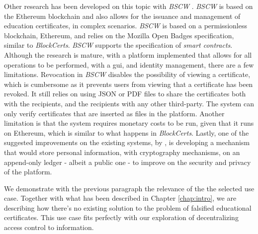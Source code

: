 Other research has been developed on this topic with \emph{BSCW} \cite{grather_blockchain_2018}. \emph{BSCW} is based on the Ethereum blockchain and also allows for the issuance and management of education certificates, in complex scenarios. \emph{BSCW} is based on a permissionless blockchain, Ethereum, and relies on the Mozilla Open Badges specification, similar to \emph{BlockCerts}. \emph{BSCW} supports the specification of \emph{smart contracts}. Although the research is mature, with a platform implemented that allows for all operations to be performed, with a \gls{gui}, and identity management, there are a few limitations. Revocation in \emph{BSCW} disables the possibility of viewing a certificate, which is cumbersome as it prevents users from viewing that a certificate has been revoked. It still relies on using JSON or PDF files to share the certificates both with the recipients, and the recipients with any other third-party. The system can only verify certificates that are inserted as files in the platform. Another limitation is that the system requires monetary costs to be run, given that it runs on Ethereum, which is similar to what happens in \emph{BlockCerts}. Lastly, one of the suggested improvements on the existing systems, by \cite{grather_blockchain_2018} \cite{grather_blockchain_2018}, is developing a mechanism that would store personal information, with cryptography mechanisms, on an append-only ledger - albeit a public one - to improve on the security and privacy of the platform.

We demonstrate with the previous paragraph the relevance of the the selected use case. Together with what has been described in Chapter \ref{chap:intro}, we are describing how there's no existing solution to the problem of falsified educational certificates. This use case fits perfectly with our exploration of decentralizing access control to information.